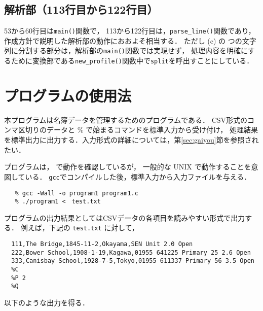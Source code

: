 \documentclass[a4j,11pt]{jarticle}
\begin{document}
\subsection{解析部（113行目から122行目）}
53から60行目は\verb|main()|関数で，
113から122行目は，\verb|parse_line()|関数であり，作成方針で説明した解析部の動作におおよそ相当する．
ただし (c) の つの文字列に分割する部分は，解析部の\verb|main()|関数では実現せず，
処理内容を明確にするために変換部である\verb|new_profile()|関数中で\verb|split|を呼出すことにしている．
\section{プログラムの使用法}\label{sec:use}


本プログラムは名簿データを管理するためのプログラムである．
CSV形式のコンマ区切りのデータと \% で始まるコマンドを標準入力から受け付け，
処理結果を標準出力に出力する．入力形式の詳細については，第\ref{sec:gaiyou}節を参照されたい．

プログラムは，                                   で動作を確認しているが，
一般的な UNIX で動作することを意図している．
\verb|gcc|でコンパイルした後，標準入力から入力ファイルを与える．

{\fontsize{10pt}{11pt} \selectfont
 \begin{verbatim}
   % gcc -Wall -o program1 program1.c
   % ./program1 <　test.txt
 \end{verbatim}
}
プログラムの出力結果としてはCSVデータの各項目を読みやすい形式で出力する．
例えば，下記の \verb|test.txt| に対して，

{\fontsize{10pt}{11pt} \selectfont
 \begin{verbatim}
  111,The Bridge,1845-11-2,Okayama,SEN Unit 2.0 Open
  222,Bower School,1908-1-19,Kagawa,01955 641225 Primary 25 2.6 Open
  333,Canisbay School,1928-7-5,Tokyo,01955 611337 Primary 56 3.5 Open
  %C
  %P 2
  %Q
 \end{verbatim}
}
\noindent %
以下のような出力を得る．
\end{document}

